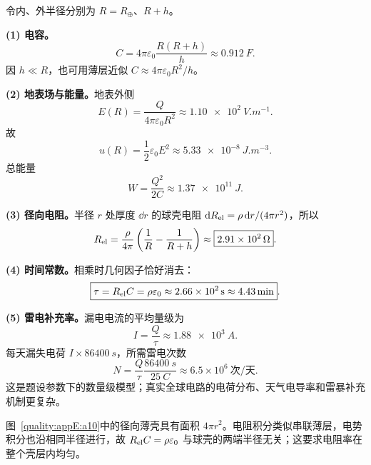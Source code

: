 \begin{xesolution}
令内、外半径分别为 $R=R_\oplus$、$R+h$。

\textbf{(1) 电容。}
\begin{equation}
  C=4\pi\varepsilon_0\frac{R(R+h)}h
  \approx\boxed{\SI{0.912}{F}}.
\end{equation}
因 $h\ll R$，也可用薄层近似 $C\approx4\pi\varepsilon_0R^2/h$。

\textbf{(2) 地表场与能量。}地表外侧
\[
  E(R)=\frac{Q}{4\pi\varepsilon_0R^2}\approx\SI{1.10e2}{V.m^{-1}}.
\]
故
\begin{equation}
  \boxed{u(R)=\frac12\varepsilon_0E^2\approx\SI{5.33e-8}{J.m^{-3}}}.
\end{equation}
总能量
\begin{equation}
  \boxed{W=\frac{Q^2}{2C}\approx\SI{1.37e11}{J}}.
\end{equation}

\textbf{(3) 径向电阻。}半径 $r$ 处厚度 $\dd r$ 的球壳电阻
$\mathop{}\!\mathrm d R_{\rm el}=\rho\mathop{}\!\mathrm d r/(4\pi r^2)$，所以
\begin{equation}
  R_{\rm el}=\frac\rho{4\pi}\left(\frac1R-\frac1{R+h}\right)
  \approx\boxed{\SI{2.91e2}{\ohm}}.
\end{equation}

\textbf{(4) 时间常数。}相乘时几何因子恰好消去：
\begin{equation}
  \boxed{\tau=R_{\rm el}C=\rho\varepsilon_0
  \approx\SI{2.66e2}{s}\approx\SI{4.43}{min}}.
\end{equation}

\textbf{(5) 雷电补充率。}漏电电流的平均量级为
\[
  I=\frac Q\tau\approx\SI{1.88e3}{A}.
\]
每天漏失电荷 $I\times\SI{86400}{s}$，所需雷电次数
\begin{equation}
  \boxed{N=\frac{Q}{\tau}\frac{\SI{86400}{s}}{\SI{25}{C}}
  \approx6.5\times10^6\ \text{次/天}}.
\end{equation}
这是题设参数下的数量级模型；真实全球电路的电荷分布、天气电导率和雷暴补充机制更复杂。


图~\ref{quality:appE:a10}中的径向薄壳具有面积 $4\pi r^2$。电阻积分类似串联薄层，电势积分也沿相同半径进行，故 $R_{\rm el}C=\rho\varepsilon_0$ 与球壳的两端半径无关；这要求电阻率在整个壳层内均匀。
\end{xesolution}

\endgroup


